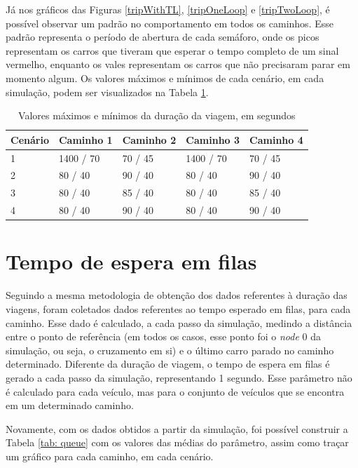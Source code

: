 Já nos gráficos das Figuras \ref{tripWithTL}, \ref{tripOneLoop} e \ref{tripTwoLoop}, é possível observar um padrão no comportamento em todos os caminhos. Esse padrão representa o período de abertura de cada semáforo, onde os picos representam os carros que tiveram que esperar o tempo completo de um sinal vermelho, enquanto os vales representam os carros que não precisaram parar em momento algum.
Os valores máximos e mínimos de cada cenário, em cada simulação, podem ser visualizados na Tabela \ref{tab: durationMinMax}.

\begin{table}[H]
\centering
\caption{Valores máximos e mínimos da duração da viagem, em segundos}
\label{tab: durationMinMax}
\begin{tabular}{@{}lllll@{}}
\toprule
Cenário & Caminho 1 & Caminho 2 & Caminho 3 & Caminho 4 \\ \midrule
1 & 1400 / 70 & 70 / 45 & 1400 / 70 & 70 / 45 \\
2 & 80 / 40 & 90 / 40 & 80 / 40 & 90 / 40 \\
3 &	80 / 40 & 85 / 40 & 80 / 40 & 85 / 40 \\
4 & 80 / 40 & 90 / 40 & 80 / 40 & 90 / 40 \\
\bottomrule
\end{tabular}
\end{table}

\section{Tempo de espera em filas}
Seguindo a mesma metodologia de obtenção dos dados referentes à duração das viagens, foram coletados dados referentes ao tempo esperado em filas, para cada caminho. Esse dado é calculado, a cada passo da simulação, medindo a distância entre o ponto de referência (em todos os casos, esse ponto foi o \textit{node} 0 da simulação, ou seja, o cruzamento em si) e o último carro parado no caminho determinado. Diferente da duração de viagem, o tempo de espera em filas é gerado a cada passo da simulação, representando 1 segundo. Esse parâmetro não é calculado para cada veículo, mas para o conjunto de veículos que se encontra em um determinado caminho.

Novamente, com os dados obtidos a partir da simulação, foi possível construir a Tabela \ref{tab: queue} com os valores das médias do parâmetro, assim como traçar um gráfico para cada caminho, em cada cenário.

